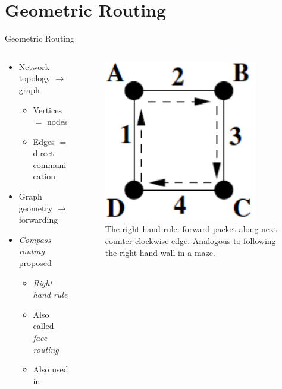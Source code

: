 \documentclass[pdftex]{beamer}
\begin{document}
\section{Geometric Routing}

\begin{frame}{Geometric Routing}
\begin{columns}
\begin{column}{.5\textwidth}
	\begin{itemize}
		\item Network topology $\rightarrow$ graph
			\begin{itemize}
				\item Vertices $=$ nodes
				\item Edges $=$ direct communication
			\end{itemize}
		\pause
		\item Graph geometry $\rightarrow$ forwarding
		\pause
		\item \emph{Compass routing} proposed \cite{Kranakis99compassrouting}
		\begin{itemize}
			\item \emph{Right-hand rule}
			\item Also called \emph{face routing}
			\item Also used in \cite{Kuhn2003, Kim:2005:GRM:1251203.1251219}
		\end{itemize}
\end{itemize}
\end{column}

\begin{column}{.5\textwidth}
\begin{figure}
\includegraphics[width=.5\textwidth]{right_hand_rule}
\caption{The right-hand rule: forward packet along next counter-clockwise edge. Analogous to following the right hand wall in a maze.}
\end{figure}
\end{column}
\end{columns}
\end{frame}
\end{document}
